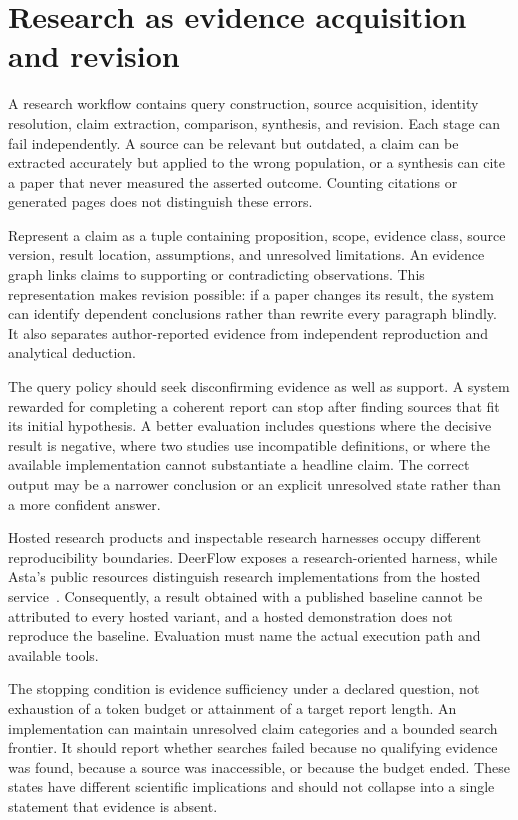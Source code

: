\section{Research as evidence acquisition and revision}\label{sec:C24:research}
A research workflow contains query construction, source acquisition, identity resolution, claim extraction, comparison, synthesis, and revision. Each stage can fail independently. A source can be relevant but outdated, a claim can be extracted accurately but applied to the wrong population, or a synthesis can cite a paper that never measured the asserted outcome. Counting citations or generated pages does not distinguish these errors.

Represent a claim as a tuple containing proposition, scope, evidence class, source version, result location, assumptions, and unresolved limitations. An evidence graph links claims to supporting or contradicting observations. This representation makes revision possible: if a paper changes its result, the system can identify dependent conclusions rather than rewrite every paragraph blindly. It also separates author-reported evidence from independent reproduction and analytical deduction.

The query policy should seek disconfirming evidence as well as support. A system rewarded for completing a coherent report can stop after finding sources that fit its initial hypothesis. A better evaluation includes questions where the decisive result is negative, where two studies use incompatible definitions, or where the available implementation cannot substantiate a headline claim. The correct output may be a narrower conclusion or an explicit unresolved state rather than a more confident answer.

Hosted research products and inspectable research harnesses occupy different reproducibility boundaries. DeerFlow exposes a research-oriented harness, while Asta's public resources distinguish research implementations from the hosted service~\cite{executionproduct029,executionproduct058}. Consequently, a result obtained with a published baseline cannot be attributed to every hosted variant, and a hosted demonstration does not reproduce the baseline. Evaluation must name the actual execution path and available tools.

The stopping condition is evidence sufficiency under a declared question, not exhaustion of a token budget or attainment of a target report length. An implementation can maintain unresolved claim categories and a bounded search frontier. It should report whether searches failed because no qualifying evidence was found, because a source was inaccessible, or because the budget ended. These states have different scientific implications and should not collapse into a single statement that evidence is absent.

